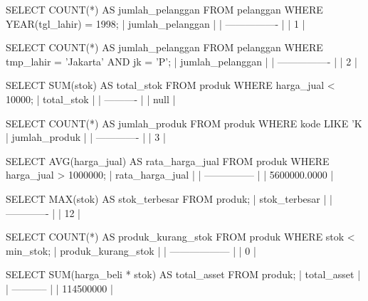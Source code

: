 SELECT COUNT(*) AS jumlah_pelanggan FROM pelanggan WHERE YEAR(tgl_lahir) = 1998;
| jumlah_pelanggan |
| ---------------- |
| 1                |

SELECT COUNT(*) AS jumlah_pelanggan FROM pelanggan WHERE tmp_lahir = 'Jakarta' AND jk = 'P';
| jumlah_pelanggan |
| ---------------- |
| 2                |

SELECT SUM(stok) AS total_stok FROM produk WHERE harga_jual < 10000;
| total_stok |
| ---------- |
| null       |

SELECT COUNT(*) AS jumlah_produk FROM produk WHERE kode LIKE 'K%
| jumlah_produk |
| ------------- |
| 3             |

SELECT AVG(harga_jual) AS rata_harga_jual FROM produk WHERE harga_jual > 1000000;
| rata_harga_jual |
| --------------- |
| 5600000.0000    |

SELECT MAX(stok) AS stok_terbesar FROM produk;
| stok_terbesar |
| ------------- |
| 12            |

SELECT COUNT(*) AS produk_kurang_stok FROM produk WHERE stok < min_stok;
| produk_kurang_stok |
| ------------------ |
| 0                  |

SELECT SUM(harga_beli * stok) AS total_asset FROM produk;
| total_asset |
| ----------- |
| 114500000   |
